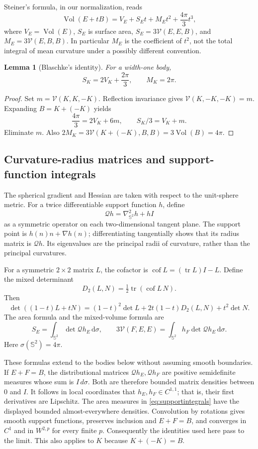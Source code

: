 \documentclass[11pt]{article}
\numberwithin{equation}{section}
\newtheorem{lemma}[theorem]{Lemma}
\theoremstyle{definition}\newtheorem{definition}[theorem]{Definition}
\theoremstyle{remark}\newtheorem{remark}[theorem]{Remark}
\newcommand{\Sph}{\mathbb S^2}
\newcommand{\Vol}{\operatorname{Vol}}
\newcommand{\tr}{\operatorname{tr}}
\newcommand{\cof}{\operatorname{cof}}
\newcommand{\Qh}{\mathcal Q}
\newcommand{\dd}{\,\mathrm d}
\newcommand{\mix}{\mathcal V}
\begin{document}
Steiner's formula, in our normalization, reads
\begin{equation}\label{eq:steiner}
 \Vol(E+tB)=V_E+S_Et+M_Et^2+\frac{4\pi}{3}t^3,
\end{equation}
where $V_E=\Vol(E)$, $S_E$ is surface area,
$S_E=3\mix(E,E,B)$, and $M_E=3\mix(E,B,B)$. In particular $M_E$ is the
coefficient of $t^2$, not the total integral of mean curvature under a
possibly different convention.

\begin{lemma}[Blaschke's identity]\label{lem:blaschke}
For a width-one body,
\begin{equation}\label{eq:blaschke}
 S_K=2V_K+\frac{2\pi}{3},\qquad M_K=2\pi.
\end{equation}
\end{lemma}
\begin{proof}
Set $m=\mix(K,K,-K)$. Reflection invariance gives
$\mix(K,-K,-K)=m$. Expanding $B=K+(-K)$ yields
\[
 \frac{4\pi}{3}=2V_K+6m,\qquad S_K/3=V_K+m.
\]
Eliminate $m$. Also
$2M_K=3\mix(K+(-K),B,B)=3\Vol(B)=4\pi$.
\end{proof}

\subsection{Curvature-radius matrices and support-function integrals}
The spherical gradient and Hessian are taken with respect to the unit-sphere
metric. For a twice differentiable support function $h$, define
\[
 \Qh h=\nabla^2_{\Sph}h+hI
\]
as a symmetric operator on each two-dimensional tangent plane. The support
point is $h(n)n+\nabla h(n)$; differentiating tangentially shows that its
radius matrix is $\Qh h$. Its eigenvalues are the principal radii of
curvature, rather than the principal curvatures.

For a symmetric $2\times2$ matrix $L$, the cofactor is
$\cof L=(\tr L)I-L$. Define the mixed determinant
\[
 D_2(L,N)=\tfrac12\tr(\cof L\,N).
\]
Then
\begin{equation}\label{eq:detpolar}
 \det((1-t)L+tN)=(1-t)^2\det L+2t(1-t)D_2(L,N)+t^2\det N.
\end{equation}
The area formula and the mixed-volume formula are
\begin{equation}\label{eq:supportintegrals}
 S_E=\int_{\Sph}\det\Qh h_E\dd\sigma,\qquad
 3\mix(F,E,E)=\int_{\Sph}h_F\det\Qh h_E\dd\sigma.
\end{equation}
Here $\sigma(\Sph)=4\pi$.

These formulas extend to the bodies below without assuming smooth boundaries.
If $E+F=B$, the distributional matrices $\Qh h_E,\Qh h_F$ are positive
semidefinite measures whose sum is $I\,d\sigma$. Both are therefore bounded
matrix densities between $0$ and $I$. It follows in local coordinates that
$h_E,h_F\in C^{1,1}$; that is, their first derivatives are Lipschitz. The
area measures in \cref{eq:supportintegrals} have the displayed bounded
almost-everywhere densities. Convolution by rotations gives smooth support
functions, preserves inclusion and $E+F=B$, and converges in $C^1$ and in
$W^{2,p}$ for every finite $p$. Consequently the identities used here pass
to the limit. This also applies to $K$ because $K+(-K)=B$.
\end{document}
